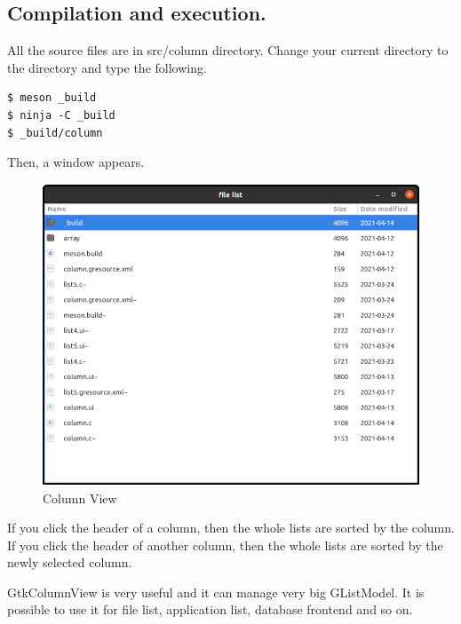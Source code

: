 \hypertarget{compilation-and-execution.}{%
\subsection{Compilation and
execution.}\label{compilation-and-execution.}}

All the source files are in src/column directory. Change your current
directory to the directory and type the following.

\begin{lstlisting}
$ meson _build
$ ninja -C _build
$ _build/column
\end{lstlisting}

Then, a window appears.

\begin{figure}
\centering
\includegraphics[width=11.3cm,height=9cm]{../image/column_view.png}
\caption{Column View}
\end{figure}

If you click the header of a column, then the whole lists are sorted by
the column. If you click the header of another column, then the whole
lists are sorted by the newly selected column.

GtkColumnView is very useful and it can manage very big GListModel. It
is possible to use it for file list, application list, database frontend
and so on.
